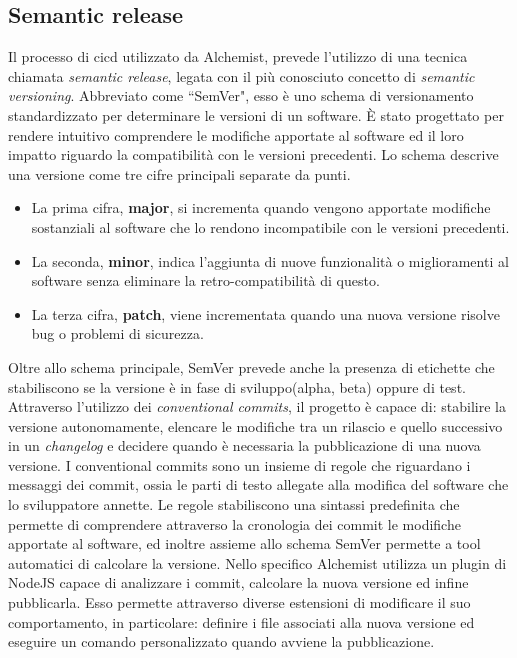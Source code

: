 \subsection{Semantic release}
Il processo di \ac{cicd} utilizzato da Alchemist, prevede l'utilizzo di una tecnica chiamata \textit{semantic release}, legata con il più conosciuto concetto di \textit{semantic versioning}. Abbreviato come ``SemVer", esso è uno schema di versionamento standardizzato per determinare le versioni di un software. È stato progettato per rendere intuitivo comprendere le modifiche apportate al software ed il loro impatto riguardo la compatibilità con le versioni precedenti. Lo schema descrive una versione come tre cifre principali separate da punti.
\begin{itemize}
	\item La prima cifra, \textbf{major}, si incrementa quando vengono apportate modifiche sostanziali al software che lo rendono incompatibile con le versioni precedenti.
	\item La seconda, \textbf{minor}, indica l'aggiunta di nuove funzionalità o miglioramenti al software senza eliminare la retro-compatibilità di questo.
	\item La terza cifra, \textbf{patch}, viene incrementata quando una nuova versione risolve bug o problemi di sicurezza.
\end{itemize}
Oltre allo schema principale, SemVer prevede anche la presenza di etichette che stabiliscono se la versione è in fase di sviluppo(alpha, beta) oppure di test.
Attraverso l'utilizzo dei \textit{conventional commits}, il progetto è capace di: stabilire la versione autonomamente, elencare le modifiche tra un rilascio e quello successivo in un \textit{changelog} e decidere quando è necessaria la pubblicazione di una nuova versione. I conventional commits sono un insieme di regole che riguardano i messaggi dei commit, ossia le parti di testo allegate alla modifica del software che lo sviluppatore annette. Le regole stabiliscono una sintassi predefinita che permette di comprendere attraverso la cronologia dei commit le modifiche apportate al software, ed inoltre assieme allo schema SemVer permette a tool automatici di calcolare la versione. Nello specifico Alchemist utilizza un plugin di NodeJS capace di analizzare i commit, calcolare la nuova versione ed infine pubblicarla. Esso permette attraverso diverse estensioni di modificare il suo comportamento, in particolare: definire i file associati alla nuova versione ed eseguire un comando personalizzato quando avviene la pubblicazione.

